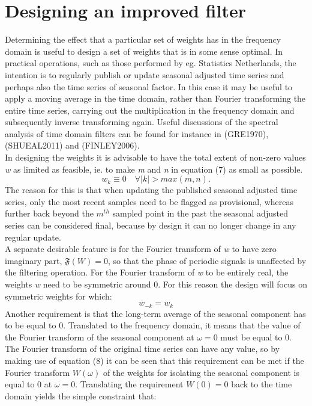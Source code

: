 \documentclass{article}
\begin{document}
\section{Designing an improved filter}
Determining the effect that a particular set of weights has in the frequency domain is useful to design a set of weights that is in some sense optimal. In practical operations, such as those performed by eg. Statistics Netherlands, the intention  is to regularly publish or update seasonal adjusted time series and perhaps also the time series of seasonal factor. In this case it may be useful to apply a moving average in the time domain, rather than Fourier transforming the entire time series, carrying out the multiplication in the frequency domain and subsequently inverse transforming again. Useful discussions of the spectral analysis of time domain filters can be found for instance in (GRE1970),(SHUEAL2011) and (FINLEY2006). \\In designing the weights it is advisable to have the total extent of non-zero values \textit{w} as limited as feasible, ie. to make \textit{m} and \textit{n} in equation (7) as small as possible.
\begin{equation}
w_k \equiv 0 \quad \forall |k| > max(m,n).
\end{equation}
The reason for this is that when updating the published seasonal adjusted time series, only the most recent samples need to be flagged as provisional, whereas further back beyond the $m^{th}$ sampled point in the past the seasonal adjusted series can be considered final, because by design it can no longer change in any regular update.\\A separate desirable feature is for the Fourier transform of \textit{w} to have zero imaginary part, $\mathfrak{F}(W) = 0$, so that the phase of periodic signals is unaffected by the filtering operation. For the Fourier transform of \textit{w} to be entirely real, the weights \textit{w} need to be symmetric around 0. For this reason the design will focus on symmetric weights for which:
\begin{equation}
w_{-k} = w_k
\end{equation}
Another requirement is that the long-term average of the seasonal component has to be equal to 0. Translated to the frequency domain, it means that the value of the Fourier transform of the seasonal component at $\omega=0$ must be equal to 0. The Fourier transform of the original time series can have any value, so by making use of equation (8) it can be seen that this requirement can be met if the Fourier transform $W(\omega)$ of the weights for isolating the seasonal component is equal to 0 at $\omega=0$.  Translating the requirement $W(0)=0$ back to the time domain yields the simple constraint that:
\end{document}
